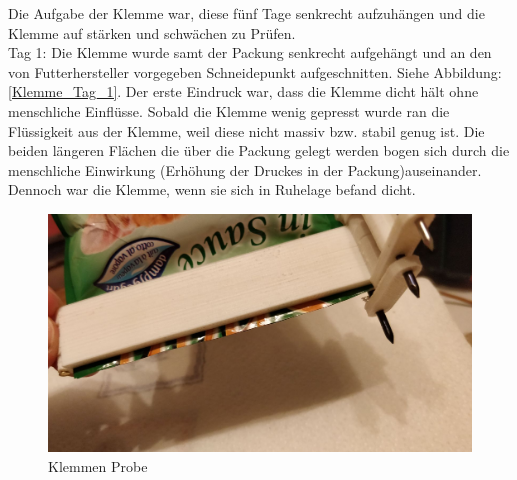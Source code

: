 Die Aufgabe der Klemme war, diese fünf Tage senkrecht aufzuhängen und die Klemme auf stärken und schwächen zu Prüfen.\\

Tag 1: Die Klemme wurde samt der Packung senkrecht aufgehängt und an den von Futterhersteller vorgegeben Schneidepunkt aufgeschnitten. Siehe Abbildung: \ref{Klemme_Tag_1}. Der erste Eindruck war, dass die Klemme dicht hält ohne menschliche Einflüsse. Sobald die Klemme wenig gepresst wurde ran die Flüssigkeit aus der Klemme, weil diese nicht massiv bzw. stabil genug ist. Die beiden längeren Flächen die über die Packung gelegt werden bogen sich durch die menschliche Einwirkung (Erhöhung der Druckes in der Packung)auseinander. Dennoch war die Klemme, wenn sie sich in Ruhelage befand dicht.

\begin{figure}[H]
   \begin{minipage}[hbt]{.5\linewidth} %
      \includegraphics[width=\linewidth]{Bilder/Dichtheitsexperiment/Probe}
      \caption{Klemmen Probe}
      \label{Klemmen_Probe} 
   \end{minipage}
   \hspace{.2\linewidth}%
   \begin{minipage}[hbt]{.3\linewidth} %

\end{minipage}
\end{figure}
